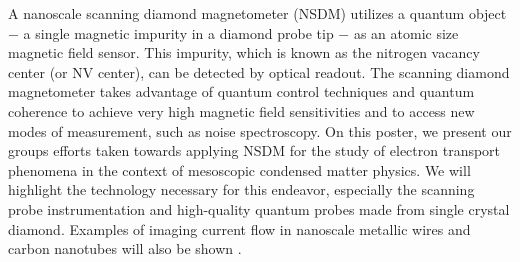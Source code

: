A nanoscale scanning diamond magnetometer (NSDM) utilizes a quantum object $-$ a single magnetic impurity in a diamond probe tip $-$ as an atomic size magnetic field sensor. This impurity, which is known as the nitrogen vacancy center (or NV center), can be detected by optical readout. The scanning diamond magnetometer takes advantage of quantum control techniques and quantum coherence to achieve very high magnetic field sensitivities and to access new modes of measurement, such as noise spectroscopy.
On this poster, we present our groups efforts taken towards applying NSDM for the study of electron transport phenomena in the context of mesoscopic condensed matter physics. We will highlight the technology necessary for this endeavor, especially the scanning probe instrumentation and high-quality quantum probes made from single crystal diamond. Examples of imaging current flow in nanoscale metallic wires and carbon nanotubes will also be shown \cite{Chang_2017}.